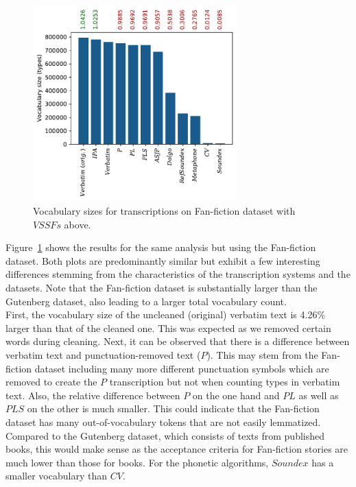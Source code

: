\begin{figure}
  \centering
  \includegraphics[width=0.7\textwidth]{figures/vocab_sizes_2021-07-27_16-57-38_ff_pt}
  \caption{Vocabulary sizes for transcriptions on Fan-fiction dataset with $VSSFs$ above.}
  \label{fig:vssf_transcriptions_ff}
\end{figure}
Figure~\ref{fig:vssf_transcriptions_ff} shows the results for the same analysis but using the Fan-fiction dataset.
Both plots are predominantly similar but exhibit a few interesting differences stemming from the characteristics of the transcription systems and the datasets.
Note that the Fan-fiction dataset is substantially larger than the Gutenberg dataset, also leading to a larger total vocabulary count.\\
First, the vocabulary size of the uncleaned (original) verbatim text is 4.26\% larger than that of the cleaned one.
This was expected as we removed certain words during cleaning.
Next, it can be observed that there is a difference between verbatim text and punctuation-removed text ($P$).
This may stem from the Fan-fiction dataset including many more different punctuation symbols which are removed to create the $P$ transcription but not when counting types in verbatim text.
Also, the relative difference between $P$ on the one hand and $PL$ as well as $PLS$ on the other is much smaller.
This could indicate that the Fan-fiction dataset has many out-of-vocabulary tokens that are not easily lemmatized.
Compared to the Gutenberg dataset, which consists of texts from published books, this would make sense as the acceptance criteria for Fan-fiction stories are much lower than those for books.
For the phonetic algorithms, $Soundex$ has a smaller vocabulary than $CV$.
